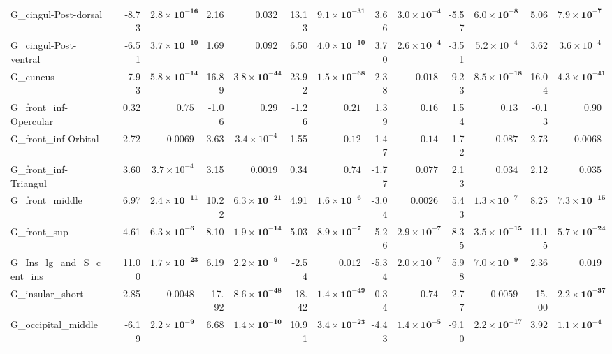 {\begin{longtable}{llrrrrrrrrrrrr}
G\_cingul-Post-dorsal &  & -8.73 & $\mathbf{2.8{\times}10^{-16}}$ & 2.16 & $0.032$ & 13.13 & $\mathbf{9.1{\times}10^{-31}}$ & 3.66 & $\mathbf{3.0{\times}10^{-4}}$ & -5.57 & $\mathbf{6.0{\times}10^{-8}}$ & 5.06 & $\mathbf{7.9{\times}10^{-7}}$ \\
G\_cingul-Post-ventral &  & -6.51 & $\mathbf{3.7{\times}10^{-10}}$ & 1.69 & $0.092$ & 6.50 & $\mathbf{4.0{\times}10^{-10}}$ & 3.70 & $\mathbf{2.6{\times}10^{-4}}$ & -3.51 & $5.2{\times}10^{-4}$ & 3.62 & $3.6{\times}10^{-4}$ \\
G\_cuneus &  & -7.93 & $\mathbf{5.8{\times}10^{-14}}$ & 16.89 & $\mathbf{3.8{\times}10^{-44}}$ & 23.92 & $\mathbf{1.5{\times}10^{-68}}$ & -2.38 & $0.018$ & -9.23 & $\mathbf{8.5{\times}10^{-18}}$ & 16.04 & $\mathbf{4.3{\times}10^{-41}}$ \\
G\_front\_inf-Opercular &  & 0.32 & $0.75$ & -1.06 & $0.29$ & -1.26 & $0.21$ & 1.39 & $0.16$ & 1.54 & $0.13$ & -0.13 & $0.90$ \\
G\_front\_inf-Orbital &  & 2.72 & $0.0069$ & 3.63 & $3.4{\times}10^{-4}$ & 1.55 & $0.12$ & -1.47 & $0.14$ & 1.72 & $0.087$ & 2.73 & $0.0068$ \\
G\_front\_inf-Triangul &  & 3.60 & $3.7{\times}10^{-4}$ & 3.15 & $0.0019$ & 0.34 & $0.74$ & -1.77 & $0.077$ & 2.13 & $0.034$ & 2.12 & $0.035$ \\
G\_front\_middle &  & 6.97 & $\mathbf{2.4{\times}10^{-11}}$ & 10.22 & $\mathbf{6.3{\times}10^{-21}}$ & 4.91 & $\mathbf{1.6{\times}10^{-6}}$ & -3.04 & $0.0026$ & 5.43 & $\mathbf{1.3{\times}10^{-7}}$ & 8.25 & $\mathbf{7.3{\times}10^{-15}}$ \\
G\_front\_sup &  & 4.61 & $\mathbf{6.3{\times}10^{-6}}$ & 8.10 & $\mathbf{1.9{\times}10^{-14}}$ & 5.03 & $\mathbf{8.9{\times}10^{-7}}$ & 5.26 & $\mathbf{2.9{\times}10^{-7}}$ & 8.35 & $\mathbf{3.5{\times}10^{-15}}$ & 11.15 & $\mathbf{5.7{\times}10^{-24}}$ \\
G\_Ins\_lg\_and\_S\_cent\_ins &  & 11.00 & $\mathbf{1.7{\times}10^{-23}}$ & 6.19 & $\mathbf{2.2{\times}10^{-9}}$ & -2.54 & $0.012$ & -5.34 & $\mathbf{2.0{\times}10^{-7}}$ & 5.98 & $\mathbf{7.0{\times}10^{-9}}$ & 2.36 & $0.019$ \\
G\_insular\_short &  & 2.85 & $0.0048$ & -17.92 & $\mathbf{8.6{\times}10^{-48}}$ & -18.42 & $\mathbf{1.4{\times}10^{-49}}$ & 0.34 & $0.74$ & 2.77 & $0.0059$ & -15.00 & $\mathbf{2.2{\times}10^{-37}}$ \\
G\_occipital\_middle &  & -6.19 & $\mathbf{2.2{\times}10^{-9}}$ & 6.68 & $\mathbf{1.4{\times}10^{-10}}$ & 10.91 & $\mathbf{3.4{\times}10^{-23}}$ & -4.43 & $\mathbf{1.4{\times}10^{-5}}$ & -9.10 & $\mathbf{2.2{\times}10^{-17}}$ & 3.92 & $\mathbf{1.1{\times}10^{-4}}$ \\

\end{longtable}}
